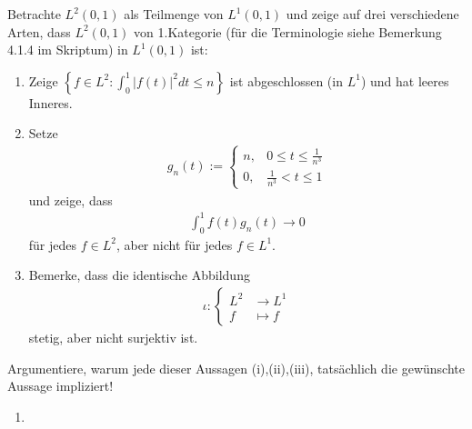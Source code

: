\begin{exercise}
Betrachte $L^2(0,1)$ als Teilmenge von $L^1(0,1)$ und zeige auf drei verschiedene
Arten, dass $L^2(0,1)$ von 1.Kategorie (für die Terminologie siehe Bemerkung 4.1.4
im Skriptum) in $L^1(0,1)$ ist:
\begin{enumerate}[label = (\roman*)]
  \item Zeige $\left\{f \in L^2: \int_0^1 |f(t)|^2 dt \leq n\right\}$ ist
  abgeschlossen (in $L^1$) und hat leeres Inneres.
  \item Setze
  \begin{align*}
    g_n(t) := \begin{cases}
      n, & 0 \leq t \leq \frac{1}{n^3} \\
      0, & \frac{1}{n^3} < t \leq 1
    \end{cases}
  \end{align*}
  und zeige, dass
  \begin{align*}
    \int_0^1 f(t)g_n(t) \rightarrow 0
  \end{align*}
  für jedes $f \in L^2$, aber nicht für jedes $f \in L^1$.
  \item Bemerke, dass die identische Abbildung
  \begin{align*}
    \iota: \begin{cases}
      L^2 &\rightarrow L^1 \\
      f &\mapsto f
    \end{cases}
  \end{align*}
  stetig, aber nicht surjektiv ist.
\end{enumerate}
Argumentiere, warum jede dieser Aussagen (i),(ii),(iii), tatsächlich die
gewünschte Aussage impliziert!

\end{exercise}
\begin{solution}
\begin{enumerate}[label = (\roman*)]
  \item
\end{enumerate}
\end{solution}
